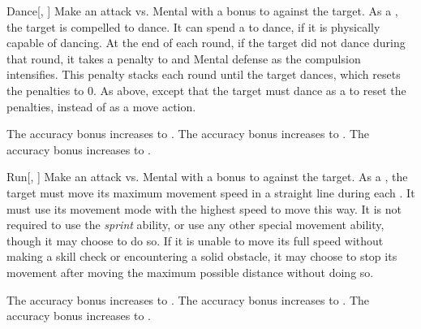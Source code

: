 \lowercase{\hypertarget{spell:Dance}{}}\label{spell:Dance}
\begin{freeability}[Rank 2]{\hypertarget{spell:Dance}{Dance}}[, ]
Make an attack vs. Mental with a  bonus to  against the target.
\hit As a , the target is compelled to dance.
It can spend a  to dance, if it is physically capable of dancing.
At the end of each round, if the target did not dance during that round, it takes a  penalty to  and Mental defense as the compulsion intensifies.
This penalty stacks each round until the target dances, which resets the penalties to 0.
\crit As above, except that the target must dance as a  to reset the penalties, instead of as a move action.

\rankline
{} The accuracy bonus increases to .
 The accuracy bonus increases to .
 The accuracy bonus increases to .

\end{freeability}
\vspace{0.25em}



\lowercase{\hypertarget{spell:Run}{}}\label{spell:Run}
\begin{freeability}[Rank 2]{\hypertarget{spell:Run}{Run}}[, ]
Make an attack vs. Mental with a  bonus to  against the target.
\hit As a , the target must move its maximum movement speed in a straight line during each .
It must use its movement mode with the highest speed to move this way.
It is not required to use the \textit{sprint} ability, or use any other special movement ability, though it may choose to do so.
If it is unable to move its full speed without making a skill check or encountering a solid obstacle, it may choose to stop its movement after moving the maximum possible distance without doing so.

\rankline
{} The accuracy bonus increases to .
 The accuracy bonus increases to .
 The accuracy bonus increases to .

\end{freeability}
\vspace{0.25em}



